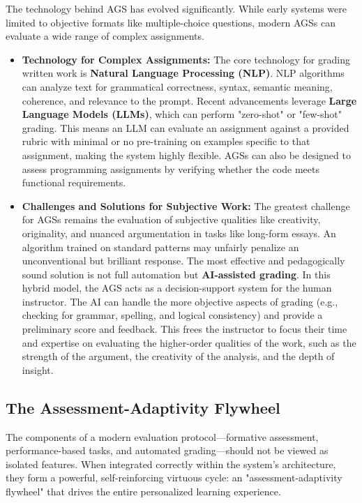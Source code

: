 \documentclass{article}
\begin{document}
The technology behind AGS has evolved significantly. While early systems were limited to objective formats like multiple-choice questions, modern AGSs can evaluate a wide range of complex assignments.\cite{103}
\begin{itemize}
    \item \textbf{Technology for Complex Assignments:} The core technology for grading written work is \textbf{Natural Language Processing (NLP)}. NLP algorithms can analyze text for grammatical correctness, syntax, semantic meaning, coherence, and relevance to the prompt.\cite{103, 106, 107} Recent advancements leverage \textbf{Large Language Models (LLMs)}, which can perform "zero-shot" or "few-shot" grading. This means an LLM can evaluate an assignment against a provided rubric with minimal or no pre-training on examples specific to that assignment, making the system highly flexible.\cite{104} AGSs can also be designed to assess programming assignments by verifying whether the code meets functional requirements.\cite{102}
    \item \textbf{Challenges and Solutions for Subjective Work:} The greatest challenge for AGSs remains the evaluation of subjective qualities like creativity, originality, and nuanced argumentation in tasks like long-form essays.\cite{105, 106} An algorithm trained on standard patterns may unfairly penalize an unconventional but brilliant response.\cite{106} The most effective and pedagogically sound solution is not full automation but \textbf{AI-assisted grading}. In this hybrid model, the AGS acts as a decision-support system for the human instructor.\cite{102} The AI can handle the more objective aspects of grading (e.g., checking for grammar, spelling, and logical consistency) and provide a preliminary score and feedback. This frees the instructor to focus their time and expertise on evaluating the higher-order qualities of the work, such as the strength of the argument, the creativity of the analysis, and the depth of insight.\cite{106}
\end{itemize}

\subsection{The Assessment-Adaptivity Flywheel}

The components of a modern evaluation protocol—formative assessment, performance-based tasks, and automated grading—should not be viewed as isolated features. When integrated correctly within the system's architecture, they form a powerful, self-reinforcing virtuous cycle: an "assessment-adaptivity flywheel" that drives the entire personalized learning experience.
\end{document}
